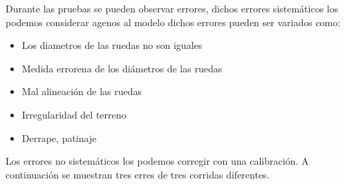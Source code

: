 \documentclass[oneside,onecolumn]{article}
\begin{document}
Durante las pruebas se pueden observar errores, dichos errores sistemáticos los podemos considerar agenos al modelo dichos errores pueden ser variados como:
\begin{itemize}
\item Los diametros de las ruedas no son iguales
\item Medida errorena de los diámetros de las ruedas
\item Mal alineación de las ruedas
\item Irregularidad del terreno
\item Derrape, patinaje
\end{itemize}

Los errores no sistemáticos los podemos corregir con una calibración. A continuación se muestran tres erres de tres corridas diferentes.
\end{document}
